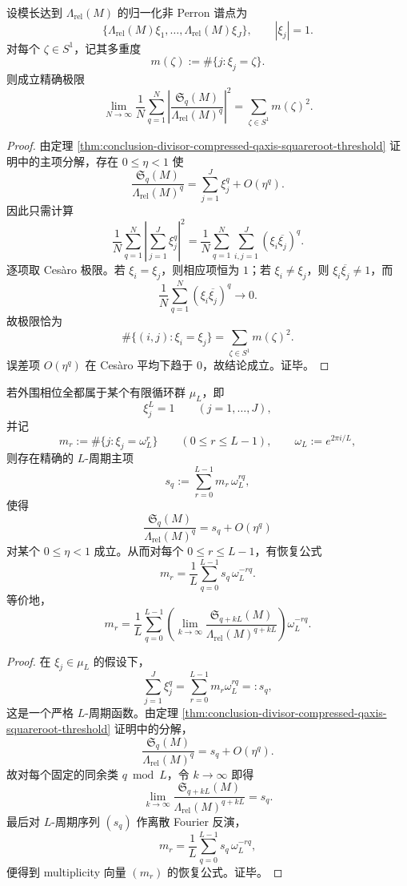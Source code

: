 \begin{theorem}\label{thm:conclusion-peripheral-phase-multiplicity-cesaro-quadratic-law}
设模长达到 \(\Lambda_{\mathrm{rel}}(M)\) 的归一化非 Perron 谱点为
\[
\{\Lambda_{\mathrm{rel}}(M)\xi_1,\dots,\Lambda_{\mathrm{rel}}(M)\xi_J\},
\qquad |\xi_j|=1.
\]
对每个 \(\zeta\in S^1\)，记其多重度
\[
m(\zeta):=\#\{j:\xi_j=\zeta\}.
\]
则成立精确极限
\[
\lim_{N\to\infty}\frac1N\sum_{q=1}^{N}
\left|
\frac{\mathfrak S_q(M)}{\Lambda_{\mathrm{rel}}(M)^q}
\right|^2
=
\sum_{\zeta\in S^1}m(\zeta)^2.
\]
\end{theorem}
\begin{proof}
由定理 \ref{thm:conclusion-divisor-compressed-qaxis-squareroot-threshold} 证明中的主项分解，存在 \(0\le \eta<1\) 使
\[
\frac{\mathfrak S_q(M)}{\Lambda_{\mathrm{rel}}(M)^q}
=
\sum_{j=1}^{J}\xi_j^q+O(\eta^q).
\]
因此只需计算
\[
\frac1N\sum_{q=1}^{N}\left|\sum_{j=1}^{J}\xi_j^q\right|^2
=
\frac1N\sum_{q=1}^{N}\sum_{i,j=1}^{J}(\xi_i\overline{\xi_j})^q.
\]
逐项取 Ces\`aro 极限。若 \(\xi_i=\xi_j\)，则相应项恒为 \(1\)；若 \(\xi_i\neq \xi_j\)，则 \(\xi_i\overline{\xi_j}\neq 1\)，而
\[
\frac1N\sum_{q=1}^{N}(\xi_i\overline{\xi_j})^q\longrightarrow 0.
\]
故极限恰为
\[
\#\{(i,j):\xi_i=\xi_j\}
=
\sum_{\zeta\in S^1}m(\zeta)^2.
\]
误差项 \(O(\eta^q)\) 在 Ces\`aro 平均下趋于 \(0\)，故结论成立。证毕。
\end{proof}

\begin{corollary}\label{cor:conclusion-finite-periodic-peripheral-phase-fourier-tomography}
若外围相位全都属于某个有限循环群 \(\mu_L\)，即
\[
\xi_j^L=1\qquad (j=1,\dots,J),
\]
并记
\[
m_r:=\#\{j:\xi_j=\omega_L^r\}\qquad (0\le r\le L-1),
\qquad
\omega_L:=e^{2\pi i/L},
\]
则存在精确的 \(L\)-周期主项
\[
s_q:=\sum_{r=0}^{L-1}m_r\,\omega_L^{rq},
\]
使得
\[
\frac{\mathfrak S_q(M)}{\Lambda_{\mathrm{rel}}(M)^q}=s_q+O(\eta^q)
\]
对某个 \(0\le \eta<1\) 成立。从而对每个 \(0\le r\le L-1\)，有恢复公式
\[
m_r=\frac1L\sum_{q=0}^{L-1}s_q\,\omega_L^{-rq}.
\]
等价地，
\[
m_r
=
\frac1L\sum_{q=0}^{L-1}
\left(
\lim_{k\to\infty}\frac{\mathfrak S_{q+kL}(M)}{\Lambda_{\mathrm{rel}}(M)^{q+kL}}
\right)\omega_L^{-rq}.
\]
\end{corollary}
\begin{proof}
在 \(\xi_j\in \mu_L\) 的假设下，
\[
\sum_{j=1}^{J}\xi_j^q
=
\sum_{r=0}^{L-1}m_r\omega_L^{rq}
=:s_q,
\]
这是一个严格 \(L\)-周期函数。由定理 \ref{thm:conclusion-divisor-compressed-qaxis-squareroot-threshold} 证明中的分解，
\[
\frac{\mathfrak S_q(M)}{\Lambda_{\mathrm{rel}}(M)^q}
=s_q+O(\eta^q).
\]
故对每个固定的同余类 \(q\bmod L\)，令 \(k\to\infty\) 即得
\[
\lim_{k\to\infty}\frac{\mathfrak S_{q+kL}(M)}{\Lambda_{\mathrm{rel}}(M)^{q+kL}}
=s_q.
\]
最后对 \(L\)-周期序列 \((s_q)\) 作离散 Fourier 反演，
\[
m_r=\frac1L\sum_{q=0}^{L-1}s_q\,\omega_L^{-rq},
\]
便得到 multiplicity 向量 \((m_r)\) 的恢复公式。证毕。
\end{proof}

